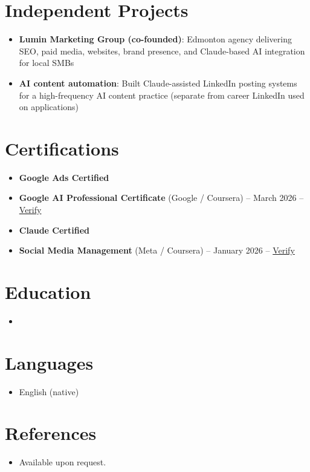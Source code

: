 \documentclass[11pt,a4paper,sans]{moderncv}
\begin{document}
\section{Independent Projects}
\vspace{1pt}
\begin{itemize}
\item \textbf{Lumin Marketing Group (co-founded)}: Edmonton agency delivering SEO, paid media, websites, brand presence, and Claude-based AI integration for local SMBs
\item \textbf{AI content automation}: Built Claude-assisted LinkedIn posting systems for a high-frequency AI content practice (separate from career LinkedIn used on applications)
\end{itemize}

\section{Certifications}
\vspace{1pt}
\begin{itemize}
\item \textbf{Google Ads Certified}
\item \textbf{Google AI Professional Certificate} (Google / Coursera) -- March 2026 -- \href{https://www.coursera.org/account/accomplishments/verify/professional-cert/54E1P3RBHVL8}{Verify}
\item \textbf{Claude Certified}
\item \textbf{Social Media Management} (Meta / Coursera) -- January 2026 -- \href{https://www.coursera.org/account/accomplishments/verify/7NOVGMU2L69G}{Verify}
\end{itemize}

\section{Education}
\vspace{1pt}
\begin{itemize}
\item{}
\end{itemize}

\section{Languages}
\vspace{1pt}
\begin{itemize}
\item English (native)
\end{itemize}

\section{References}
\vspace{1pt}
\begin{itemize}
\item{Available upon request.}
\end{itemize}
\end{document}
